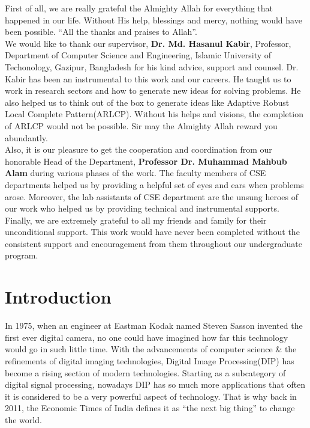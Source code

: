 \documentclass[12pt]{article}
\begin{document}
First of all, we are really grateful the Almighty Allah for everything that happened in our life. Without His help, blessings and mercy, nothing would have been possible. ``All the thanks and praises to Allah''.\\
\linebreak
\noindent We would like to thank our supervisor,\textbf{ Dr. Md. Hasanul Kabir}, Professor, Department of Computer Science and Engineering, Islamic University of Techonology, Gazipur, Bangladesh for his kind advice, support and counsel. Dr. Kabir has been an instrumental to this
work and our careers. He taught us to work in research sectors and how to generate new ideas for solving problems. He also helped us to think out of the box to generate ideas like Adaptive Robust Local Complete Pattern(ARLCP). Without his helps and visions, the completion of ARLCP would not be possible. Sir may the Almighty Allah
reward you abundantly.\\
\linebreak
\noindent Also, it is our pleasure to get the cooperation and coordination from our honorable Head
of the Department, \textbf{Professor Dr. Muhammad Mahbub Alam} during various phases of the work. The faculty members of CSE departments helped us by providing a helpful set of eyes and
ears when problems arose. Moreover, the lab assistants of CSE department are the unsung heroes of our work who helped us by providing technical and instrumental supports.\\
\linebreak 
\noindent  Finally, we are extremely grateful to all my friends and family for their unconditional support.
This work would have never been completed without the consistent support and
encouragement from them throughout our undergraduate program.\\
\newpage
\tableofcontents
\newpage
\listoffigures
\newpage
\listoftables
\newpage
{}
\section{Introduction}

In 1975, when an engineer at Eastman Kodak named Steven Sasson invented the first ever digital camera, no one could have imagined how far this technology would go in such little time\cite{DigCam}. With the advancements of computer science \& the refinements of digital imaging technologies, Digital Image Processing(DIP) has become a rising section of modern technologies. Starting as a subcategory of digital signal processing, nowadays DIP has so much more applications that often it is considered to be a very powerful aspect of technology. That is why back in 2011, the Economic Times of India defines it as ``the next big thing'' to change the world\cite{EcTimes}.\\
\end{document}
